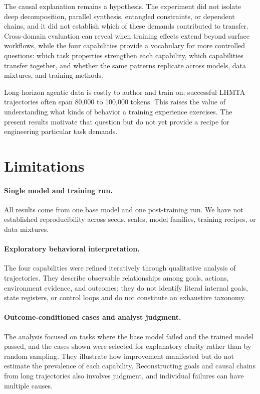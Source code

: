 \documentclass{article}
\begin{document}
The causal explanation remains a hypothesis. The experiment did not isolate deep decomposition, parallel synthesis, entangled constraints, or dependent chains, and it did not establish which of these demands contributed to transfer. Cross-domain evaluation can reveal when training effects extend beyond surface workflows, while the four capabilities provide a vocabulary for more controlled questions: which task properties strengthen each capability, which capabilities transfer together, and whether the same patterns replicate across models, data mixtures, and training methods.

Long-horizon agentic data is costly to author and train on; successful LHMTA trajectories often span 80,000 to 100,000 tokens. This raises the value of understanding what kinds of behavior a training experience exercises. The present results motivate that question but do not yet provide a recipe for engineering particular task demands.

\section{Limitations}
\label{sec:limitations}

\paragraph{Single model and training run.} All results come from one base model and one post-training run. We have not established reproducibility across seeds, scales, model families, training recipes, or data mixtures.

\paragraph{Exploratory behavioral interpretation.} The four capabilities were refined iteratively through qualitative analysis of trajectories. They describe observable relationships among goals, actions, environment evidence, and outcomes; they do not identify literal internal goals, state registers, or control loops and do not constitute an exhaustive taxonomy.

\paragraph{Outcome-conditioned cases and analyst judgment.} The analysis focused on tasks where the base model failed and the trained model passed, and the cases shown were selected for explanatory clarity rather than by random sampling. They illustrate how improvement manifested but do not estimate the prevalence of each capability. Reconstructing goals and causal chains from long trajectories also involves judgment, and individual failures can have multiple causes.
\end{document}
